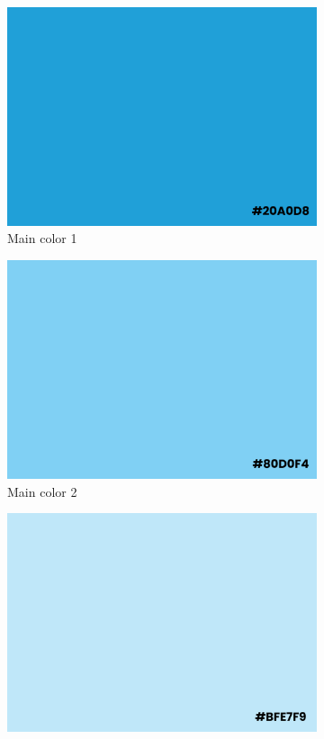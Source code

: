 \begin{figure}[H]
\begin{subfigure}{.5\textwidth}
  \centering
  \includegraphics[width=.9\linewidth]{images/color1.png}  
  \caption{Main color 1}
  \label{fig:sub-first}
\end{subfigure}
\begin{subfigure}{.5\textwidth}
  \centering
  \includegraphics[width=.9\linewidth]{images/4.png}  
  \caption{Main color 2}
  \label{fig:sub-second}
\end{subfigure}
\begin{subfigure}{.5\textwidth}
  \centering
  \includegraphics[width=.9\linewidth]{images/3.png} 

\end{subfigure}
\end{figure}
